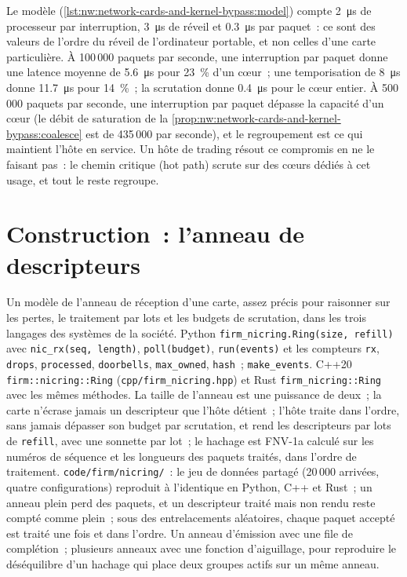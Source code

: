 Le modèle (\cref{lst:nw:network-cards-and-kernel-bypass:model}) compte \qty{2}{\micro\second} de processeur par interruption,
\qty{3}{\micro\second} de réveil et \qty{0.3}{\micro\second} par paquet~: ce sont des valeurs de l'ordre du réveil de l'ordinateur portable, et non celles
d'une carte particulière. À 100\,000 paquets par seconde, une interruption par paquet donne une latence moyenne de \qty{5.6}{\micro\second} pour 23~\% d'un cœur~;
une temporisation de \qty{8}{\micro\second} donne \qty{11.7}{\micro\second} pour 14~\%~; la scrutation donne \qty{0.4}{\micro\second} pour le cœur entier.
À 500\,000 paquets par seconde, une interruption par paquet dépasse la capacité d'un cœur (le débit de saturation de la
\cref{prop:nw:network-cards-and-kernel-bypass:coalesce} est de 435\,000 par seconde), et le regroupement est ce qui maintient l'hôte en service. Un hôte de trading
résout ce compromis en ne le faisant pas~: le chemin critique (hot path) scrute sur des cœurs dédiés à cet usage, et tout le reste regroupe.

\section{Construction~: l'anneau de descripteurs}\label{bld:nw:network-cards-and-kernel-bypass:nicring}

\begin{build}
 Un modèle de l'anneau de réception d'une carte, assez précis pour raisonner sur les pertes, le traitement par lots et les budgets de scrutation, dans
les trois langages des systèmes de la société.
 Python \texttt{firm\_nicring.Ring(size, refill)} avec \texttt{nic\_rx(seq, length)}, \texttt{poll(budget)},
\texttt{run(events)} et les compteurs \texttt{rx}, \texttt{drops}, \texttt{processed}, \texttt{doorbells}, \texttt{max\_owned},
\texttt{hash}~; \texttt{make\_events}. C++20 \texttt{firm::nicring::Ring} (\texttt{cpp/firm\_nicring.hpp}) et Rust
\texttt{firm\_nicring::Ring} avec les mêmes méthodes.
 La taille de l'anneau est une puissance de deux~; la carte n'écrase jamais un descripteur que l'hôte détient~; l'hôte traite dans l'ordre,
sans jamais dépasser son budget par scrutation, et rend les descripteurs par lots de \texttt{refill}, avec une sonnette par lot~; le hachage est FNV-1a calculé sur
les numéros de séquence et les longueurs des paquets traités, dans l'ordre de traitement.
 \texttt{code/firm/nicring/}~: le jeu de données partagé (20\,000 arrivées, quatre configurations) reproduit à l'identique en
Python, C++ et Rust~; un anneau plein perd des paquets, et un descripteur traité mais non rendu reste compté comme plein~; sous des entrelacements aléatoires,
chaque paquet accepté est traité une fois et dans l'ordre.
 Un anneau d'émission avec une file de complétion~; plusieurs anneaux avec une fonction d'aiguillage, pour reproduire le déséquilibre d'un hachage qui place
deux groupes actifs sur un même anneau.
\end{build}


